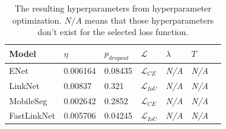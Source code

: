 \documentclass{kththesis}
\begin{document}
\begin{table}[]
\centering
\caption{The resulting hyperparameters from hyperparameter optimization. \(\textit{N/A}\)
means that those hyperparameters don't exist for the selected loss function.}
\label{tab:res_hyper}
\begin{tabular}{@{}lllllll@{}}
\toprule
Model       & \(\eta\) & \(p_{dropout}\) & \(\mathcal{L}\) & \(\lambda\) & \(T\)\\ \midrule
ENet       & 0.006164 & 0.08435 & \(\mathcal{L}_{ CE }\) & \textit{N/A} & \textit{N/A}\\
LinkNet    & 0.00837 & 0.321 & \(\mathcal{L}_{ IoU } \) & \textit{N/A} & \textit{N/A}\\
MobileSeg   & 0.002642 & 0.2852 & \(\mathcal{L}_{ CE }\) & \textit{N/A} & \textit{N/A}\\
FastLinkNet  & 0.005706 & 0.04245 & \(\mathcal{L}_{ IoU }\) & \textit{N/A} & \textit{N/A}\\\bottomrule
\end{tabular}
\end{table}
\end{document}
